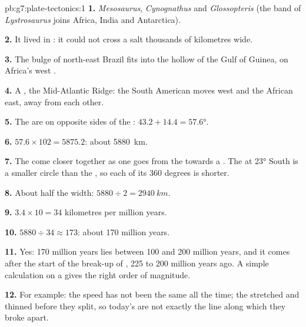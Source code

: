 \begin{solution}{pb:g7:plate-tectonics:1}
\textbf{1.} \emph{Mesosaurus}, \emph{Cynognathus} and \emph{Glossopteris}
(the band of \emph{Lystrosaurus} joins Africa, India and Antarctica).

\textbf{2.} It lived in : it could not cross a salt 
thousands of kilometres wide.

\textbf{3.} The bulge of north-east Brazil fits into the hollow of the
Gulf of Guinea, on Africa's west .

\textbf{4.} A , the Mid-Atlantic Ridge: the South
American  moves west and the African  east, away from each other.

\textbf{5.} The  are on opposite sides of the :
$43.2 + 14.4 = \ang{57.6}$.

\textbf{6.} $57.6 \times 102 = 5875.2$: about \qty{5880}{km}.

\textbf{7.} The  come closer together as one goes from the
 towards a . The  at \ang{23} South is a smaller circle
than the , so each of its 360 degrees is shorter.

\textbf{8.} About half the width: $5880 \div 2 = \qty{2940}{km}$.

\textbf{9.} $3.4 \times 10 = 34$ kilometres per million years.

\textbf{10.} $5880 \div 34 \approx 173$: about 170 million years.

\textbf{11.} Yes: 170 million years lies between 100 and 200 million years,
and it comes after the start of the break-up of , 225 to 200 million
years ago. A simple calculation on a  gives the right order of
magnitude.

\textbf{12.} For example: the speed has not been the same all the time;
the  stretched and thinned before they split, so today's 
are not exactly the line along which they broke apart.
\end{solution}
